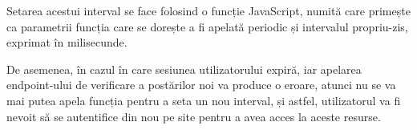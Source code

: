 Setarea acestui interval se face folosind o funcție JavaScript, numită  care primește ca parametrii funcția care se dorește a fi apelată periodic și intervalul propriu-zis, exprimat în milisecunde.\newline

De asemenea, în cazul în care sesiunea utilizatorului expiră, iar apelarea endpoint-ului de verificare a postărilor noi va produce o eroare, atunci nu se va mai putea apela funcția  pentru a seta un nou interval, și astfel, utilizatorul va fi nevoit să se autentifice din nou pe site pentru a avea acces la aceste resurse.\newline

\label{chap:03}